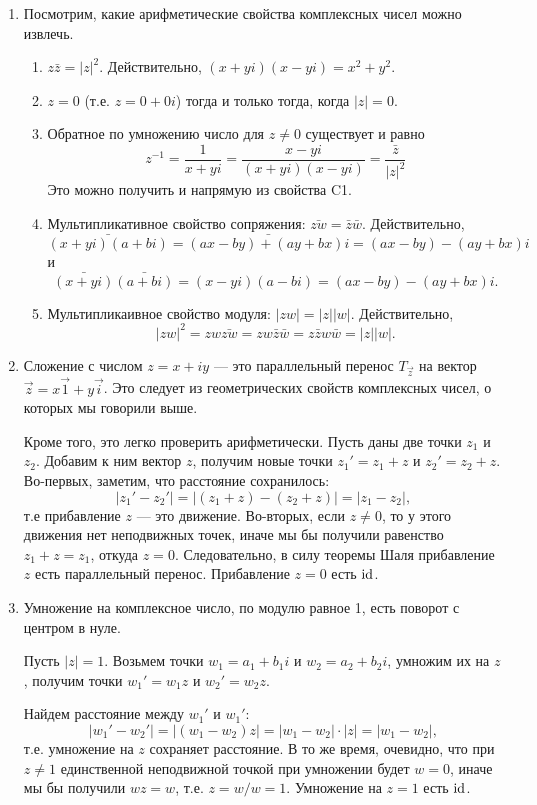 \begin{enumerate}
\item Посмотрим, какие арифметические свойства комплексных чисел можно извлечь.
\begin{enumerate}[\bf C1)]
\item $z\bar z=|z|^2$. Действительно, $(x+yi)(x-yi)=x^2+y^2$.
\item $z=0$ (т.е. $z=0+0i$) тогда и только тогда, когда $|z|=0$.
\item Обратное по умножению число для $z\ne 0$ существует и равно
$$
z^{-1} = \frac{1}{x+yi}=\frac{x-yi}{(x+yi)(x-yi)}=\frac{\bar z}{|z|^2}
$$
Это можно получить и напрямую из свойства C1.
\item Мультипликативное свойство сопряжения: $\bar{zw}=\bar{z}\bar{w}$. Действительно,
$$ 
\bar{(x+yi)(a+bi)} = \bar{(ax-by)+(ay+bx)i} = (ax-by)-(ay+bx)i
$$
и
$$
\bar{(x+yi)}\bar{(a+bi)} = (x-yi)(a-bi) = (ax-by)-(ay+bx)i.
$$
\item Мультипликаивное свойство модуля: $|zw|=|z||w|$. Действительно,
$$
|zw|^2 = zw\bar{zw} = zw\bar{z}\bar{w} = z\bar{z}w\bar{w} = |z||w|.
$$
\end{enumerate}
\item Сложение с числом $z=x+iy$ --- это параллельный перенос $T_{\vec z}$ на вектор $\vec z=x\vec 1+y\vec i$. Это следует из геометрических свойств комплексных чисел, о которых мы говорили выше.

Кроме того, это легко проверить арифметически. Пусть даны две точки $z_1$ и $z_2$. Добавим к ним вектор $z$, получим новые точки $z_1'=z_1+z$ и $z_2'=z_2+z$. Во-первых, заметим, что расстояние сохранилось:
$$
|z_1'-z_2'| = |(z_1+z)-(z_2+z)| = |z_1-z_2|,
$$
т.е прибавление $z$ --- это движение. Во-вторых, если $z\ne 0$, то у этого движения нет неподвижных точек, иначе мы бы получили равенство $z_1+z=z_1$, откуда $z=0$. Следовательно, в силу теоремы Шаля прибавление $z$ есть параллельный перенос. Прибавление $z=0$ есть $\mathrm{id}$.
\item Умножение на комплексное число, по модулю равное 1, есть поворот с центром в нуле.

Пусть $|z|=1$. Возьмем точки $w_1=a_1+b_1i$ и $w_2=a_2+b_2i$,  умножим их на $z$, получим точки $w_1'=w_1z$ и $w_2'=w_2z$.

Найдем расстояние между $w_1'$ и $w_1'$:
$$
|w_1'-w_2'|=|(w_1-w_2)z|=|w_1-w_2|\cdot|z|=|w_1-w_2|,
$$
т.е. умножение на $z$ сохраняет расстояние. В то же время, очевидно, что при $z\ne 1$ единственной неподвижной точкой при умножении будет $w=0$, иначе мы бы получили $wz=w$, т.е. $z=w/w=1$. Умножение на $z=1$ есть $\mathrm{id}$.


\end{enumerate}
